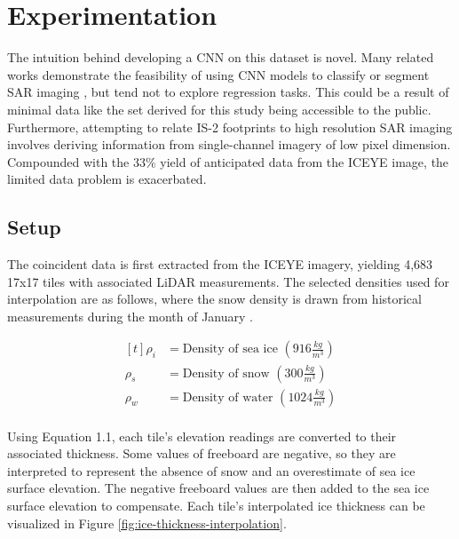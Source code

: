 \chapter{Experimentation}
\label{sec:Experimentation}

The intuition behind developing a CNN on this dataset is novel. Many related works demonstrate the feasibility of using CNN models to classify or segment SAR imaging \cite{SAR-U-Net}, but tend not to explore regression tasks. This could be a result of minimal data like the set derived for this study being accessible to the public. Furthermore, attempting to relate IS-2 footprints to high resolution SAR imaging involves deriving information from single-channel imagery of low pixel dimension. Compounded with the 33$\%$ yield of anticipated data from the ICEYE image, the limited data problem is exacerbated. 

\section{Setup}
The coincident data is first extracted from the ICEYE imagery, yielding 4,683 17x17 tiles with associated LiDAR measurements. The selected densities used for interpolation are as follows, where the snow density is drawn from historical measurements during the month of January \cite{warren1999snow}.

\begin{figure}[h]
  \[
  \begin{aligned}[t]
    \rho_i &=  \text{Density of sea ice }(916 \frac{kg}{m^3}) \\   %
    \rho_s &=  \text{Density of snow }(300 \frac{kg}{m^3}) \\   %
    \rho_w &=  \text{Density of water }(1024 \frac{kg}{m^3}) \\   %
  \end{aligned}
\]
\end{figure}
  
Using Equation 1.1, each tile's elevation readings are converted to their associated thickness. Some values of freeboard are negative, so they are interpreted to represent the absence of snow and an overestimate of sea ice surface elevation. The negative freeboard values are then added to the sea ice surface elevation to compensate. Each tile's interpolated ice thickness can be visualized in Figure \ref{fig:ice-thickness-interpolation}.

